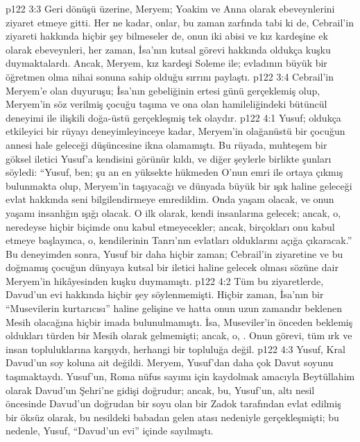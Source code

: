 \vs p122 3:3 Geri dönüşü üzerine, Meryem; Yoakim ve Anna olarak ebeveynlerini ziyaret etmeye gitti. Her ne kadar, onlar, bu zaman zarfında tabi ki de, Cebrail’in ziyareti hakkında hiçbir şey bilmeseler de, onun iki abisi ve kız kardeşine ek olarak ebeveynleri, her zaman, İsa’nın kutsal görevi hakkında oldukça kuşku duymaktalardı. Ancak, Meryem, kız kardeşi Soleme ile; evladının büyük bir öğretmen olma nihai sonuna sahip olduğu sırrını paylaştı.
\vs p122 3:4 Cebrail’in Meryem’e olan duyuruşu; İsa’nın gebeliğinin ertesi günü gerçeklemiş olup, Meryem’in söz verilmiş çocuğu taşıma ve ona olan hamileliğindeki bütüncül deneyimi ile ilişkili doğa\hyp{}üstü gerçekleşmiş tek olaydır.
\vs p122 4:1 Yusuf; oldukça etkileyici bir rüyayı deneyimleyinceye kadar, Meryem’in olağanüstü bir çocuğun annesi hale geleceği düşüncesine ikna olamamıştı. Bu rüyada, muhteşem bir göksel iletici Yusuf’a kendisini görünür kıldı, ve diğer şeylerle birlikte şunları söyledi: “Yusuf, ben; şu an en yüksekte hükmeden O’nun emri ile ortaya çıkmış bulunmakta olup, Meryem’in taşıyacağı ve dünyada büyük bir ışık haline geleceği evlat hakkında seni bilgilendirmeye emredildim. Onda yaşam olacak, ve onun yaşamı insanlığın ışığı olacak. O ilk olarak, kendi insanlarına gelecek; ancak, o, neredeyse hiçbir biçimde onu kabul etmeyecekler; ancak, birçokları onu kabul etmeye başlayınca, o, kendilerinin Tanrı’nın evlatları olduklarını açığa çıkaracak.” Bu deneyimden sonra, Yusuf bir daha hiçbir zaman; Cebrail’in ziyaretine ve bu doğmamış çocuğun dünyaya kutsal bir iletici haline gelecek olması sözüne dair Meryem’in hikâyesinden kuşku duymamıştı.
\vs p122 4:2 Tüm bu ziyaretlerde, Davud’un evi hakkında hiçbir şey söylenmemişti. Hiçbir zaman, İsa’nın bir “Musevilerin kurtarıcısı” haline gelişine ve hatta onun uzun zamandır beklenen Mesih olacağına hiçbir imada bulunulmamıştı. İsa, Museviler’in önceden beklemiş oldukları türden bir Mesih olarak gelmemişti; ancak, o, . Onun görevi, tüm ırk ve insan topluluklarına karşıydı, herhangi bir topluluğa değil.
\vs p122 4:3 Yusuf, Kral Davud’un soy koluna ait değildi. Meryem, Yusuf’dan daha çok Davut soyunu taşımaktaydı. Yusuf’un, Roma nüfus sayımı için kaydolmak amacıyla Beytüllahim olarak Davud’un Şehri’ne gidişi doğrudur; ancak, bu, Yusuf’un, altı nesil öncesinde Davud’un doğrudan bir soyu olan bir Zadok tarafından evlat edilmiş bir öksüz olarak, bu nesildeki babadan gelen atası nedeniyle gerçekleşmişti; bu nedenle, Yusuf, “Davud’un evi” içinde sayılmıştı.
